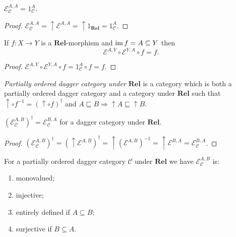 \begin{prop}
  $\mathcal{E}_{\mathcal{C}}^{A,A} = 1_{\mathcal{C}}^A$.
\end{prop}

\begin{proof}
  $\mathcal{E}_{\mathcal{C}}^{A,A} = \uparrow \mathcal{E}^{A,A} =
  \uparrow 1_{\mathbf{Rel}} = 1_{\mathcal{C}}^A$.
\end{proof}

\begin{prop}
  If $f : X \rightarrow Y$ is a $\mathbf{Rel}$-morphism and
  $\operatorname{im} f = A \subseteq Y$ then
  \[ \mathcal{E}^{A,Y} \circ \mathcal{E}^{Y,A} \circ f = f. \]
\end{prop}

\begin{proof}
  $\mathcal{E}^{A,Y} \circ \mathcal{E}^{Y,A} \circ f = 1_{\mathcal{C}}^A
  \circ f = f$.
\end{proof}

\begin{defn}
  \emph{Partially ordered dagger category under $\mathbf{Rel}$} is
  a category which is both a partially ordered dagger category and a category
  under $\mathbf{Rel}$ such that $\uparrow \circ f^{- 1} = (\uparrow
  \circ f)^{\dagger}$ and $A \sqsubseteq B \Rightarrow \uparrow A \sqsubseteq
  \uparrow B$.
\end{defn}

\begin{prop}
  $(\mathcal{E}_{\mathcal{C}}^{A,B})^{\dagger} = \mathcal{E}_{\mathcal{C}}^{B,A}$ for a dagger category under
  $\mathbf{Rel}$.
\end{prop}

\begin{proof}
  $(\mathcal{E}_{\mathcal{C}}^{A,B})^{\dagger} = (\uparrow \mathcal{E}^{A,B})^{\dagger} = \uparrow (\mathcal{E}^{A,B})^{- 1} =
  \uparrow \mathcal{E}^{B,A} = \mathcal{E}_{\mathcal{C}}^{B,A}$.
\end{proof}

\begin{prop}
  For a partially ordered dagger category $\mathcal{C}$ under
  $\mathbf{Rel}$ we have $\mathcal{E}_{\mathcal{C}}^{A,B}$ is:
  \begin{enumerate}
    \item monovalued;
    
    \item injective;
    
    \item entirely defined if $A \subseteq B$;
    
    \item surjective if $B \subseteq A$.
  \end{enumerate}
\end{prop}

